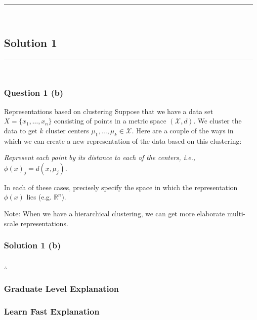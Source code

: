 \documentclass{article}
\begin{document}
\noindent\rule{\textwidth}{0.4pt}\\

\newpage

\subsection*{Solution 1}
\noindent\rule{\textwidth}{0.4pt}\\
\subsubsection*{Question 1 (b)}
\begin{flushleft}
    Representations based on clustering Suppose that we have a data set $X=\{x_1, \ldots, x_n\}$ consisting of points in a metric space $(\mathcal{X}, d)$. We cluster the data to get $k$ cluster centers $\mu_1, \ldots, \mu_k \in \mathcal{X}$. Here are a couple of the ways in which we can create a new representation of the data based on this clustering:
\end{flushleft}
\begin{flushleft}
    \textit{Represent each point by its distance to each of the centers, i.e., $\phi(x)_j = d(x, \mu_j)$.}
\end{flushleft}
\begin{flushleft}
    In each of these cases, precisely specify the space in which the representation $\phi(x)$ lies (e.g. $\mathbb{R}^n$).

Note: When we have a hierarchical clustering, we can get more elaborate multi-scale representations.
\end{flushleft}

\subsubsection*{Solution 1 (b)}

\subsubsection*{\normalfont}{$\therefore$ }

\subsubsection*{Graduate Level Explanation}

\subsubsection*{Learn Fast Explanation}
\end{document}
